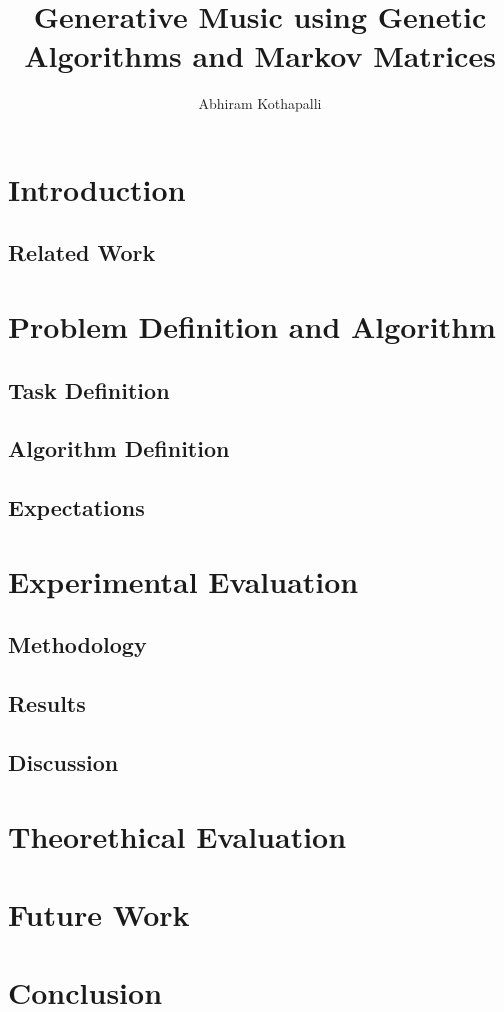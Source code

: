 \documentclass{article}
\title{Generative Music using Genetic Algorithms and Markov Matrices}
\author{Abhiram Kothapalli}
\date{}
\begin{document}
\maketitle

\section{Introduction}

\subsection{Related Work}

\section{Problem Definition and Algorithm}

\subsection{Task Definition}
\subsection{Algorithm Definition}
\subsection{Expectations}

\section{Experimental Evaluation}

\subsection{Methodology}
\subsection{Results}
\subsection{Discussion}

\section{Theorethical Evaluation}

\section{Future Work}

\section{Conclusion}
\end{document}
